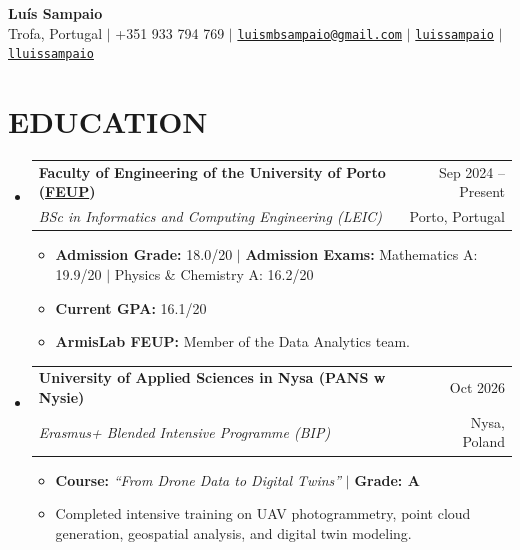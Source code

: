 \documentclass[letterpaper,11pt]{article}
\makeatletter
\newcommand{\resumeItem}[1]{
  \item\small{
    {#1 \vspace{-2pt}}
  }
}
\newcommand{\resumeSubheading}[4]{
  \vspace{-1pt}\item
    \begin{tabular*}{\textwidth}[t]{l@{\extracolsep{\fill}}r}
      \textbf{#1} & {\color{dark-grey}\small #2}\vspace{1pt}\\
      \textit{#3} & {\color{dark-grey} \small #4}\\
    \end{tabular*}\vspace{-6pt}
}
\newcommand{\resumeSubHeadingListStart}{\begin{itemize}[leftmargin=0in, label={}]}
\newcommand{\resumeSubHeadingListEnd}{\end{itemize}}
\newcommand{\resumeItemListStart}{\begin{itemize}[leftmargin=0.15in]}
\newcommand{\resumeItemListEnd}{\end{itemize}\vspace{-2pt}}
\makeatother
\begin{document}
\begin{center}
    \textbf{\Huge Luís Sampaio} \\ \vspace{5pt}
    \small 
    \faMapMarker* \hspace{2pt} Trofa, Portugal \hspace{2pt} $|$ \hspace{2pt}
    \faPhone* \hspace{2pt} +351 933 794 769 \hspace{2pt} $|$ \hspace{2pt}
    \faEnvelope \hspace{2pt} \href{mailto:luismbsampaio@gmail.com}{\texttt{luismbsampaio@gmail.com}} \hspace{2pt} $|$ \hspace{2pt}
    \faLinkedin \hspace{2pt} \href{https://www.linkedin.com/in/lu\%C3\%ADs-sampaio-84096b37a/}{\texttt{luissampaio}} \hspace{2pt} $|$ \hspace{2pt}
    \faGithub \hspace{2pt} \href{https://github.com/lluissampaio}{\texttt{lluissampaio}}
    \\ \vspace{-3pt}
\end{center}

\section{EDUCATION}
  \resumeSubHeadingListStart
    \resumeSubheading
      {Faculty of Engineering of the University of Porto (\href{https://www.up.pt/feup/pt/}{FEUP})}{Sep 2024 -- Present}
      {BSc in Informatics and Computing Engineering (LEIC)}{Porto, Portugal}
      \resumeItemListStart
        \resumeItem{\textbf{Admission Grade:} 18.0/20 $|$ \textbf{Admission Exams:} Mathematics A: 19.9/20 $|$ Physics \& Chemistry A: 16.2/20}
        \resumeItem{\textbf{Current GPA:} 16.1/20}
        \resumeItem{\textbf{ArmisLab FEUP:} Member of the Data Analytics team.}
      \resumeItemListEnd

    \resumeSubheading
      {University of Applied Sciences in Nysa (PANS w Nysie)}{Oct 2026}
      {Erasmus+ Blended Intensive Programme (BIP)}{Nysa, Poland}
      \resumeItemListStart
        \resumeItem{\textbf{Course:} \textit{``From Drone Data to Digital Twins''} $|$ \textbf{Grade: A}}
        \resumeItem{Completed intensive training on UAV photogrammetry, point cloud generation, geospatial analysis, and digital twin modeling.}
      \resumeItemListEnd
  \resumeSubHeadingListEnd
\end{document}
